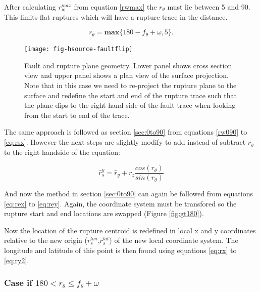 
After calculating $r_w^{max}$ from equation \ref{rwmax} the $r_\theta$ must lie between 5 and 90. This limits flat ruptures which will have a rupture trace in the distance. 

\begin{equation}
r_\theta = \mathbf{max} \{ 180 - f_\theta + \omega, 5 \} .
\end{equation}



\begin{figure}[htp]
\centerline{\texttt{[image: fig-hsource-faultflip]}}
\caption{Fault and rupture plane geometry. Lower panel shows cross section view and upper panel shows a plan view of the surface 
projection. Note that in this case we need to re-project the rupture plane to the surface and redefine the start and end of the 
rupture trace such that the plane dips to the right hand side of the fault trace when looking from the start to end of the trace.}
\label{fig:gt90}
\end{figure}


The same approach is followed as section \ref{sec:0to90} from equations \ref{rw090} to \ref{eq:rsx}. However the next steps are slightly 
modify to add instead of subtract $r_y$ to the right handside of the equation: 

\begin{equation}
\hat{r}_s^{y} = \hat{r}_y + r_z  \frac{cos(r_\theta)}{sin(r_\theta)}
\end{equation}

And now the method in section \ref{sec:0to90} can again be followed from equations \ref{eq:rex} to \ref{eq:rey}. 
Again, the coordinate system must be transfored so the rupture start and end locations are swapped (Figure \ref{fig:gt180}).

Now the location of the rupture centroid is redefined in local x and y coordinates relative to the new 
origin ($r_s^{lon}$,$ r_s^{lat}$) of the new local coordinate system. The longitude and 
latitude of this point is then found using equations \ref{eq:rx} to \ref{eq:ry2}.

\subsubsection{Case if  $180 <  r_\theta \leq f_\theta + \omega$} \label{sec:180to270}

